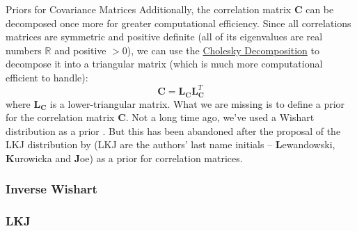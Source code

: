 \begin{frame}[noframenumbering]{Priors for Covariance Matrices}
	\small
	Additionally, the correlation matrix $\mathbf{C}$
	can be decomposed once more for greater computational efficiency.
	Since all correlations matrices are symmetric and positive definite
	(all of its eigenvalues are real numbers $\mathbb{R}$ and positive $>0$),
	we can use the \href{https://en.wikipedia.org/wiki/Cholesky_decomposition}
	{Cholesky Decomposition}
	to decompose it into a triangular matrix
	(which is much more computational efficient to handle):
	$$
		\mathbf{C} = \mathbf{L}_{\mathbf{C}} \mathbf{L}^T_{\mathbf{C}}
	$$
	where $\mathbf{L}_{\mathbf{C}}$ is a lower-triangular matrix.
	\vfill
	What we are missing is to define a prior for the correlation matrix $\mathbf{C}$.
	Not a long time ago, we've used a Wishart distribution as a prior \parencite{gelman2013bayesian}.
	But this has been abandoned after the proposal of the LKJ distribution by \textcite{lewandowski2009generating}
	(LKJ are the authors' last name initials -- \textbf{L}ewandowski, \textbf{K}urowicka and \textbf{J}oe)
	as a prior for correlation matrices.
\end{frame}

\subsubsection*{Inverse Wishart}

\subsubsection*{LKJ}
